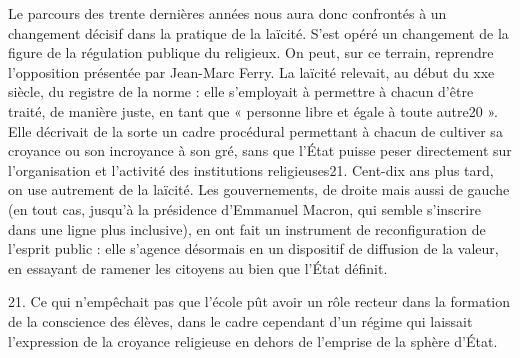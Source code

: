 Le parcours des trente dernières années nous aura donc confrontés à un changement décisif dans la pratique de la laïcité. S’est opéré un changement de la figure de la régulation publique du religieux. On peut, sur ce terrain, reprendre l’opposition présentée par Jean-Marc Ferry. La laïcité relevait, au début du xxe siècle, du registre de la norme : elle s’employait à permettre à chacun d’être traité, de manière juste, en tant que « personne libre et égale à toute autre20 ». Elle décrivait de la sorte un cadre procédural permettant à chacun de cultiver sa croyance ou son incroyance à son gré, sans que l’État puisse peser directement sur l’organisation et l’activité des 
institutions religieuses21. Cent-dix ans plus tard, on use autrement de la laïcité. Les gouvernements, de droite mais aussi de gauche (en tout cas, jusqu’à la présidence d’Emmanuel Macron, qui semble s’inscrire dans une ligne plus inclusive), en ont fait un instrument de reconfiguration de l’esprit public : elle s’agence désormais en un dispositif de diffusion de la valeur, en essayant de ramener les citoyens au bien que l’État définit.






































21.	Ce qui n’empêchait pas que l’école pût avoir un rôle recteur dans la formation de la conscience des élèves, dans le cadre cependant d’un régime qui laissait l’expression de la croyance religieuse en dehors de l’emprise de la sphère d’État.
